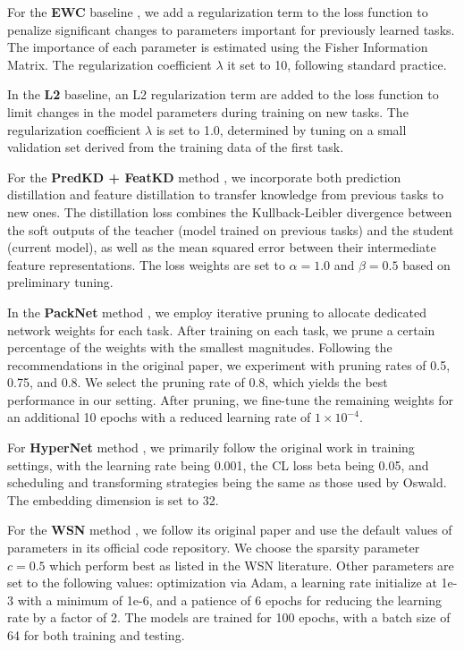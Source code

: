 For the \textbf{EWC} baseline \citep{kirkpatrick2017overcoming}, we add a regularization term to the loss function to penalize significant changes to parameters important for previously learned tasks. The importance of each parameter is estimated using the Fisher Information Matrix. The regularization coefficient $\lambda$ it set to 10, following standard practice.

In the \textbf{L2} baseline, an L2 regularization term are added to the loss function to limit changes in the model parameters during training on new tasks. The regularization coefficient $\lambda$ is set to 1.0, determined by tuning on a small validation set derived from the training data of the first task.

For the \textbf{PredKD + FeatKD} method \citep{smith2023closer}, we incorporate both prediction distillation and feature distillation to transfer knowledge from previous tasks to new ones. The distillation loss combines the Kullback-Leibler divergence between the soft outputs of the teacher (model trained on previous tasks) and the student (current model), as well as the mean squared error between their intermediate feature representations. The loss weights are set to $\alpha = 1.0$ and $\beta = 0.5$ based on preliminary tuning.

In the \textbf{PackNet} method \citep{mallya2018packnet}, we employ iterative pruning to allocate dedicated network weights for each task. After training on each task, we prune a certain percentage of the weights with the smallest magnitudes. Following the recommendations in the original paper, we experiment with pruning rates of 0.5, 0.75, and 0.8. We select the pruning rate of 0.8, which yields the best performance in our setting. After pruning, we fine-tune the remaining weights for an additional 10 epochs with a reduced learning rate of $1 \times 10^{-4}$. 

For \textbf{HyperNet} method \citep{von2020continual}, we primarily follow the original work in training settings, with the learning rate being 0.001, the CL loss beta being 0.05, and scheduling and transforming strategies being the same as those used by Oswald. The embedding dimension is set to 32.

For the \textbf{WSN} method \citep{kang2022forget}, we follow its original paper and use the default values of parameters in its official code repository.
We choose the sparsity parameter $c=0.5$ which perform best as listed in the WSN literature. Other parameters are set to the following values: optimization via Adam, a learning rate initialize at 1e-3 with a minimum of 1e-6, and a patience of 6 epochs for reducing the learning rate by a factor of 2. The models are trained for 100 epochs, with a batch size of 64 for both training and testing.

